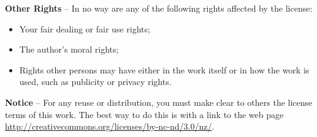 \vspace{1em}
\noindent
\textbf{Other Rights} -- In no way are any of the following rights
affected by the license:

\begin{itemize}
  \item Your fair dealing or fair use rights;
  \item The author's moral rights;
  \item Rights other persons may have either in the work itself or in
    how the work is used, such as publicity or privacy rights.
\end{itemize}

\vspace{1em}
\noindent
\textbf{Notice} -- For any reuse or distribution, you must make clear
to others the license terms of this work. The best way to do this is
with a link to the web page
\url{http://creativecommons.org/licenses/by-nc-nd/3.0/nz/}.
